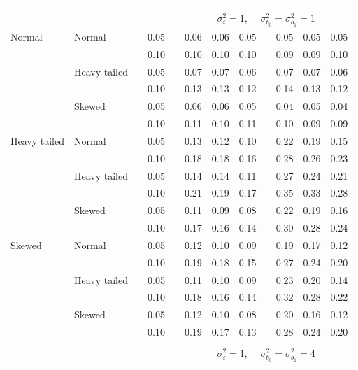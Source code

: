 \documentclass[12pt]{article} %
\begin{document}
\begin{table}[ht]
\begin{scriptsize}
\begin{center}
\begin{tabular}{ll p{.1cm} c p{.1cm} rrr p{.1cm} rrr}
&&&&&&&&&&&\\
& && && \multicolumn{7}{c}{$\sigma_{\varepsilon}^2 = 1$, \ \ $\sigma_{b_0}^2 = \sigma_{b_1}^2 = 1$} \\ \cline{6-12}
Normal       & Normal       && 0.05 &&  0.06 & 0.06 & 0.05 && 0.05 & 0.05 & 0.05 \\ 
             &              && 0.10 &&  0.10 & 0.10 & 0.10 && 0.09 & 0.09 & 0.10 \\ 
             & Heavy tailed && 0.05 &&  0.07 & 0.07 & 0.06 && 0.07 & 0.07 & 0.06 \\ 
             &              && 0.10 &&  0.13 & 0.13 & 0.12 && 0.14 & 0.13 & 0.12 \\ 
             & Skewed       && 0.05 &&  0.06 & 0.06 & 0.05 && 0.04 & 0.05 & 0.04 \\ 
             &              && 0.10 &&  0.11 & 0.10 & 0.11 && 0.10 & 0.09 & 0.09 \\ 
Heavy tailed & Normal       && 0.05 &&  0.13 & 0.12 & 0.10 && 0.22 & 0.19 & 0.15 \\ 
             &              && 0.10 &&  0.18 & 0.18 & 0.16 && 0.28 & 0.26 & 0.23 \\ 
             & Heavy tailed && 0.05 &&  0.14 & 0.14 & 0.11 && 0.27 & 0.24 & 0.21 \\ 
             &              && 0.10 &&  0.21 & 0.19 & 0.17 && 0.35 & 0.33 & 0.28 \\ 
             & Skewed       && 0.05 &&  0.11 & 0.09 & 0.08 && 0.22 & 0.19 & 0.16 \\ 
             &              && 0.10 &&  0.17 & 0.16 & 0.14 && 0.30 & 0.28 & 0.24 \\ 
Skewed       & Normal       && 0.05 &&  0.12 & 0.10 & 0.09 && 0.19 & 0.17 & 0.12 \\ 
             &              && 0.10 &&  0.19 & 0.18 & 0.15 && 0.27 & 0.24 & 0.20 \\ 
             & Heavy tailed && 0.05 &&  0.11 & 0.10 & 0.09 && 0.23 & 0.20 & 0.14 \\ 
             &              && 0.10 &&  0.18 & 0.16 & 0.14 && 0.32 & 0.28 & 0.22 \\ 
             & Skewed       && 0.05 &&  0.12 & 0.10 & 0.08 && 0.20 & 0.16 & 0.12 \\ 
             &              && 0.10 &&  0.19 & 0.17 & 0.13 && 0.28 & 0.24 & 0.20 \\ 


&&&&&&&&&&&\\
& && && \multicolumn{7}{c}{$\sigma_{\varepsilon}^2 = 1$, \ \ $\sigma_{b_0}^2 = \sigma_{b_1}^2 = 4$} \\ \cline{6-12}

\hline
\end{tabular}
\end{center}
\end{scriptsize}
\end{table}
\end{document}
